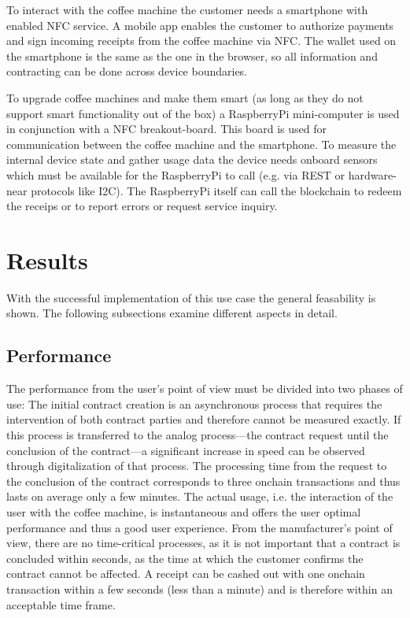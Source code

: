 \documentclass[conference]{IEEEtran}
\begin{document}
To interact with the coffee machine the customer needs a smartphone with enabled NFC service. A mobile app enables the customer to authorize payments and sign incoming receipts from the coffee machine via NFC. The wallet used on the smartphone is the same as the one in the browser, so all information and contracting can be done across device boundaries.

To upgrade coffee machines and make them smart (as long as they do not support smart functionality out of the box) a RaspberryPi mini-computer is used in conjunction with a NFC breakout-board. This board is used for communication between the coffee machine and the smartphone. To measure the internal device state and gather usage data the device needs onboard sensors which must be available for the RaspberryPi to call (e.g. via REST or hardware-near protocols like I2C). The RaspberryPi itself can call the blockchain to redeem the receips or to report errors or request service inquiry.\\


\section{Results}
With the successful implementation of this use case the general feasability is shown. The following subsections examine different aspects in detail.

\subsection{Performance}
The performance from the user's point of view must be divided into two phases of use: The initial contract creation is an asynchronous process that requires the intervention of both contract parties and therefore cannot be measured exactly. If this process is transferred to the analog process---the contract request until the conclusion of the contract---a significant increase in speed can be observed through digitalization of that process. The processing time from the request to the conclusion of the contract corresponds to three onchain transactions and thus lasts on average only a few minutes. The actual usage, i.e. the interaction of the user with the coffee machine, is instantaneous and offers the user optimal performance and thus a good user experience. From the manufacturer's point of view, there are no time-critical processes, as it is not important that a contract is concluded within seconds, as the time at which the customer confirms the contract cannot be affected. A receipt can be cashed out with one onchain transaction within a few seconds (less than a minute) and is therefore within an acceptable time frame. 
\end{document}

